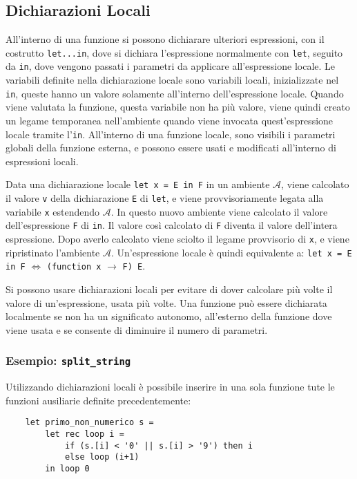 \documentclass{article}
\numberwithin{equation}{subsection}
\begin{document}
\subsection{Dichiarazioni Locali}

All'interno di una funzione si possono dichiarare ulteriori espressioni, con il costrutto \verb|let...in|, dove si dichiara l'espressione normalmente con \verb|let|, seguito da \verb|in|, dove vengono passati i parametri da applicare all'espressione locale. Le variabili definite nella dichiarazione locale sono variabili locali, inizializzate nel \verb|in|, queste hanno un valore solamente all'interno dell'espressione locale. Quando viene valutata la funzione, questa variabile non ha più valore, viene quindi creato un legame temporanea nell'ambiente quando viene invocata quest'espressione locale tramite l'\verb|in|. All'interno di una funzione locale, sono visibili i parametri globali della funzione esterna, e possono essere usati e modificati all'interno di espressioni locali. 

Data una dichiarazione locale \verb|let x = E in F| in un ambiente $\mathscr{A}$, viene calcolato il valore \verb|v| della dichiarazione \verb|E| di \verb|let|, e viene provvisoriamente legata alla variabile \verb|x| estendendo $\mathscr{A}$. In questo nuovo ambiente viene calcolato il valore dell'espressione \verb|F| di \verb|in|. Il valore così calcolato di \verb|F| diventa il valore dell'intera espressione. Dopo averlo calcolato viene sciolto il legame provvisorio di \verb|x|, e viene ripristinato l'ambiente $\mathscr{A}$. Un'espressione locale è quindi equivalente a: \verb|let x = E in F| $\Leftrightarrow$ \verb|(function x| $\rightarrow$ \verb|F) E|. 

Si possono usare dichiarazioni locali per evitare di dover calcolare più volte il valore di un'espressione, usata più volte. 
Una funzione può essere dichiarata localmente se non ha un significato autonomo, all'esterno della funzione dove viene usata e se consente di diminuire il numero di parametri. 

\subsubsection{Esempio: \texttt{split\_string}}

Utilizzando dichiarazioni locali è possibile inserire in una sola funzione tute le funzioni ausiliarie definite precedentemente:
\begin{verbatim}
    let primo_non_numerico s =
        let rec loop i = 
            if (s.[i] < '0' || s.[i] > '9') then i
            else loop (i+1)
        in loop 0
\end{verbatim}
\end{document}
